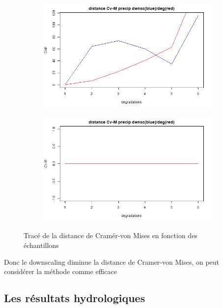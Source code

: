\documentclass[a4paper,11pt]{article}
\begin{document}
\vspace{0.5 cm}

\begin{figure}[!h]
	\label{fig:res-CVM-non-null  }
	\centering
	\begin{subfigure}[b]{0.45\textwidth}
		\includegraphics[scale=0.4]{images/Dist_CVM_precip.png}
	\end{subfigure}
	\hfill
	\begin{subfigure}[b]{0.45\textwidth}
		\includegraphics[scale=0.4]{images/Dist_CVM_evap.png}
	\end{subfigure}
	\caption{Tracé de la distance de Cramér-von Mises en fonction des échantillons}
\end{figure}

Donc le downscaling diminue la distance de Cramer-von Mises, on peut considérer la méthode comme efficace



\subsection{Les résultats hydrologiques}
\end{document}
